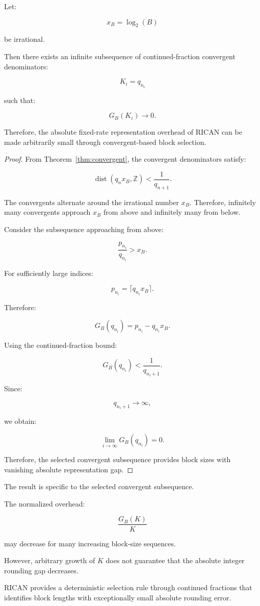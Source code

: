 \documentclass[onecolumn]{IEEEtran}
\begin{document}
\begin{theorem}
\label{thm:abs_overhead}

Let:

\[
x_B=\log_2(B)
\]

be irrational.

Then there exists an infinite subsequence of continued-fraction
convergent denominators:

\[
K_i=q_{n_i}
\]

such that:

\[
G_B(K_i)\rightarrow0 .
\]

Therefore, the absolute fixed-rate representation overhead of RICAN
can be made arbitrarily small through convergent-based block selection.

\end{theorem}

\begin{proof}

From Theorem~\ref{thm:convergent}, the convergent denominators satisfy:

\[
\operatorname{dist}(q_nx_B,\mathbb{Z})
<
\frac{1}{q_{n+1}} .
\]

The convergents alternate around the irrational number $x_B$.
Therefore, infinitely many convergents approach $x_B$ from above and
infinitely many from below.

Consider the subsequence approaching from above:

\[
\frac{p_{n_i}}{q_{n_i}}>x_B .
\]

For sufficiently large indices:

\[
p_{n_i}
=
\lceil q_{n_i}x_B\rceil .
\]

Therefore:

\[
G_B(q_{n_i})
=
p_{n_i}-q_{n_i}x_B .
\]

Using the continued-fraction bound:

\[
G_B(q_{n_i})
<
\frac{1}{q_{n_i+1}} .
\]

Since:

\[
q_{n_i+1}\rightarrow\infty ,
\]

we obtain:

\[
\lim_{i\rightarrow\infty}
G_B(q_{n_i})
=
0 .
\]

Therefore, the selected convergent subsequence provides block sizes
with vanishing absolute representation gap.

\end{proof}

\begin{remark}

The result is specific to the selected convergent subsequence.

The normalized overhead:

\[
\frac{G_B(K)}{K}
\]

may decrease for many increasing block-size sequences.

However, arbitrary growth of $K$ does not guarantee that the absolute
integer rounding gap decreases.

RICAN provides a deterministic selection rule through continued
fractions that identifies block lengths with exceptionally small
absolute rounding error.

\end{remark}
\end{document}
